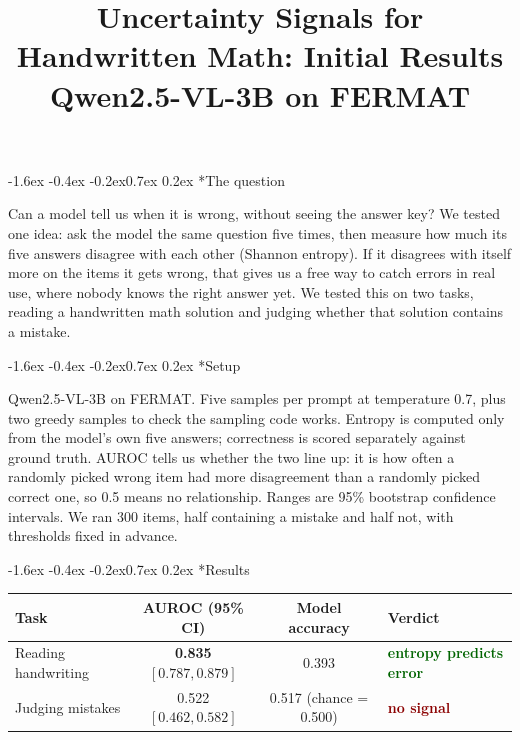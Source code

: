\documentclass[10pt]{article}
\title{\vspace{-2.3em}Uncertainty Signals for Handwritten Math: Initial Results\\
\large Qwen2.5-VL-3B on FERMAT}
\author{}
\date{}
\makeatletter
\newcommand{\worked}[1]{\textcolor{darkgreen}{\textbf{#1}}}
\newcommand{\failed}[1]{\textcolor{darkred}{\textbf{#1}}}
\renewcommand\section{\@startsection{section}{1}{\z@}%
  {-1.6ex \@plus -0.4ex \@minus -0.2ex}{0.7ex \@plus 0.2ex}%
  {\normalfont\large\bfseries}}
\makeatother
\begin{document}
\maketitle
\vspace{-2em}

\section*{The question}

Can a model tell us when it is wrong, without seeing the answer key? We tested
one idea: ask the model the same question five times, then measure how much its
five answers disagree with each other (Shannon entropy). If it disagrees with
itself more on the items it gets wrong, that gives us a free way to catch errors
in real use, where nobody knows the right answer yet. We tested this on two
tasks, reading a handwritten math solution and judging whether that solution
contains a mistake.

\section*{Setup}

Qwen2.5-VL-3B on FERMAT. Five samples per prompt at temperature 0.7, plus two
greedy samples to check the sampling code works. Entropy is computed only from
the model's own five answers; correctness is scored separately against ground
truth. AUROC tells us whether the two line up: it is how often a randomly picked
wrong item had more disagreement than a randomly picked correct one, so 0.5
means no relationship. Ranges are 95\% bootstrap confidence intervals. We ran
300 items, half containing a mistake and half not, with thresholds fixed in
advance.

\section*{Results}

\begin{center}
\small
\begin{tabular}{lccl}
\toprule
Task & AUROC (95\% CI) & Model accuracy & Verdict \\
\midrule
Reading handwriting & \textbf{0.835} $[0.787, 0.879]$ & 0.393 & \worked{entropy predicts error} \\
Judging mistakes & 0.522 $[0.462, 0.582]$ & 0.517 (chance = 0.500) & \failed{no signal} \\
\bottomrule
\end{tabular}
\end{center}
\end{document}
